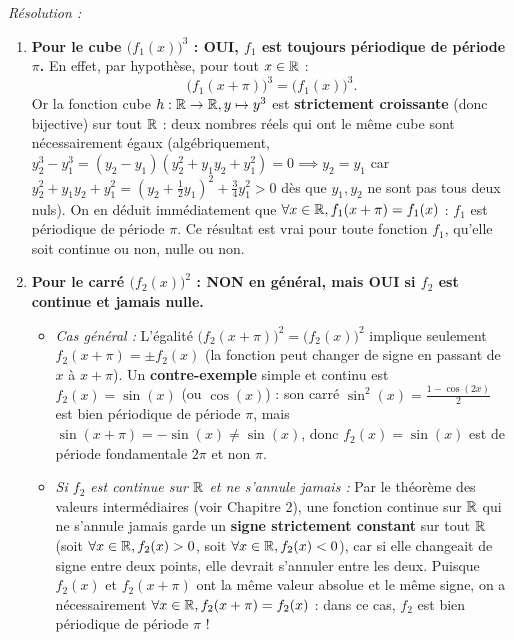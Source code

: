 \begin{exemple}
\emph{Résolution :}
\begin{enumerate}[label=\alph*)]
    \item \textbf{Pour le cube $\bigl(f_1(x)\bigr)^3$ : OUI, $f_1$ est toujours périodique de période $\pi$.} En effet, par hypothèse, pour tout $x \in \mathbb{R}$ :
    \[
        \bigl(f_1(x+\pi)\bigr)^3 = \bigl(f_1(x)\bigr)^3.
    \]
    Or la fonction cube $h : \mathbb{R} \to \mathbb{R}, y \mapsto y^3$ est \textbf{strictement croissante} (donc bijective) sur tout $\mathbb{R}$ : deux nombres réels qui ont le même cube sont nécessairement égaux (algébriquement, $y_2^3 - y_1^3 = (y_2-y_1)(y_2^2 + y_1 y_2 + y_1^2) = 0 \implies y_2 = y_1$ car $y_2^2 + y_1 y_2 + y_1^2 = (y_2 + \frac{1}{2}y_1)^2 + \frac{3}{4}y_1^2 > 0$ dès que $y_1, y_2$ ne sont pas tous deux nuls). On en déduit immédiatement que $\forall x \in \mathbb{R}, f_1(x+\pi) = f_1(x)$ : $f_1$ est périodique de période $\pi$. Ce résultat est vrai pour toute fonction $f_1$, qu'elle soit continue ou non, nulle ou non.
    \item \textbf{Pour le carré $\bigl(f_2(x)\bigr)^2$ : NON en général, mais OUI si $f_2$ est continue et jamais nulle.}
    \begin{itemize}
        \item \emph{Cas général :} L'égalité $\bigl(f_2(x+\pi)\bigr)^2 = \bigl(f_2(x)\bigr)^2$ implique seulement $f_2(x+\pi) = \pm f_2(x)$ (la fonction peut changer de signe en passant de $x$ à $x+\pi$). Un \textbf{contre-exemple} simple et continu est $f_2(x) = \sin(x)$ (ou $\cos(x)$) : son carré $\sin^2(x) = \frac{1-\cos(2x)}{2}$ est bien périodique de période $\pi$, mais $\sin(x+\pi) = -\sin(x) \neq \sin(x)$, donc $f_2(x) = \sin(x)$ est de période fondamentale $2\pi$ et non $\pi$.
        \item \emph{Si $f_2$ est continue sur $\mathbb{R}$ et ne s'annule jamais :} Par le théorème des valeurs intermédiaires (voir Chapitre 2), une fonction continue sur $\mathbb{R}$ qui ne s'annule jamais garde un \textbf{signe strictement constant} sur tout $\mathbb{R}$ (soit $\forall x \in \mathbb{R}, f_2(x) > 0$, soit $\forall x \in \mathbb{R}, f_2(x) < 0$), car si elle changeait de signe entre deux points, elle devrait s'annuler entre les deux. Puisque $f_2(x)$ et $f_2(x+\pi)$ ont la même valeur absolue et le même signe, on a nécessairement $\forall x \in \mathbb{R}, f_2(x+\pi) = f_2(x)$ : dans ce cas, $f_2$ est bien périodique de période $\pi$ !
    \end{itemize}
\end{enumerate}
\end{exemple}

